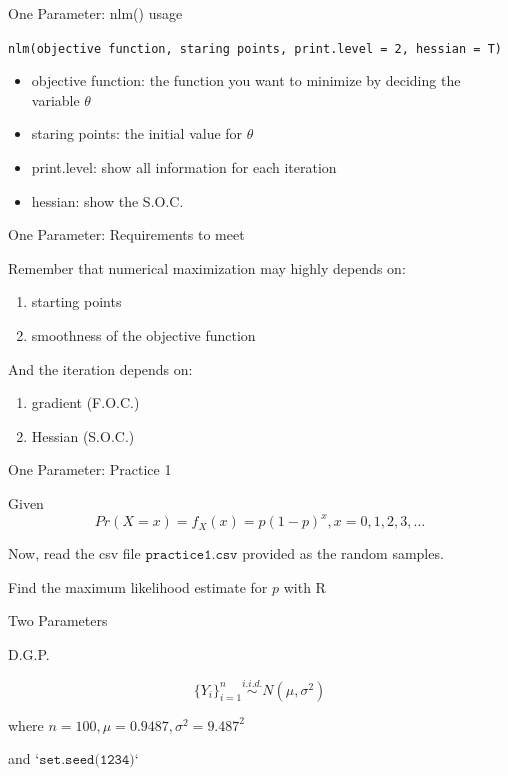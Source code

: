 \documentclass[12pt]{beamer}
\begin{document}
\begin{frame}[fragile]{One Parameter: nlm() usage}

\texttt{nlm(objective function, staring points, print.level = 2, hessian = T)}

\begin{itemize}
	\item objective function: the function you want to minimize by deciding the variable $\theta$
	\item staring points: the initial value for $\theta$
	\item print.level: show all information for each iteration
	\item hessian: show the S.O.C.
\end{itemize}

\end{frame}


\begin{frame}[fragile]{One Parameter: Requirements to meet}

Remember that numerical maximization may highly depends on:

\begin{enumerate}
	\item starting points
	\item smoothness of the objective function
\end{enumerate}

And the iteration depends on:

\begin{enumerate}
	\item gradient (F.O.C.)
	\item Hessian (S.O.C.)
\end{enumerate}

\end{frame}

\begin{frame}[fragile]{One Parameter: Practice 1}

Given $$Pr(X=x) = f_X(x) = p(1-p)^x, x=0,1,2,3,\dots$$

Now, read the csv file $\texttt{practice1.csv}$ provided as the random samples.

Find the maximum likelihood estimate for $p$ with R

\end{frame}



\begin{frame}[fragile]{Two Parameters}

D.G.P.

$$\{Y_i\}_{i=1}^n \stackrel{i.i.d.}{\sim} N(\mu, \sigma^2)$$

where $n=100, \mu=0.9487, \sigma^2 = 9.487^2$

and $\texttt{`set.seed(1234)`}$


\end{frame}
\end{document}
